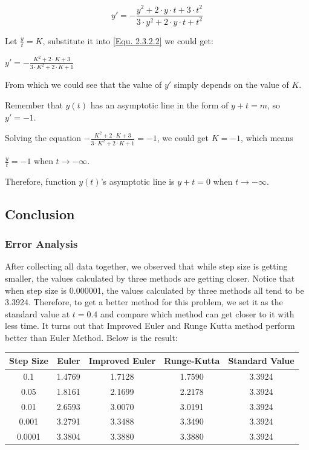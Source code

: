 \documentclass[11pt,a4paper]{article}
\begin{document}
	\begin{equation}
		y' = -\frac{y^2+2\cdot y \cdot t + 3\cdot t^2}{3\cdot y^2+2\cdot y \cdot t + t^2} \tag{Equ 2.3.2.2} \label{Equ. 2.3.2.2}
	\end{equation}

	Let $\frac{y}{t}=K$, substitute it into \ref{Equ. 2.3.2.2} we could get:
	
	\begin{center}
		$y' = -\frac{K^2+2\cdot K+3}{3\cdot K^2+ 2\cdot K +1}$
	\end{center}
	
	From which we could see that the value of $y'$ simply depends on the value of $K$.
	
	Remember that $y(t)$ has an asymptotic line in the form of $y+t=m$, so $y'=-1$.
	
	Solving the equation $-\frac{K^2+2\cdot K+3}{3\cdot K^2+ 2\cdot K +1}=-1$, we could get $K=-1$, which means 
	
	\begin{center}
		$\frac{y}{t}=-1$ when $t\rightarrow -\infty$.
	\end{center}

	Therefore, function $y(t)$'s asymptotic line is $y+t=0$ when $t \rightarrow -\infty$.
	



\subsection{Conclusion}

\subsubsection{Error Analysis}

After collecting all data together, we observed that while step size is getting smaller, the values calculated by three methods are getting closer. Notice that when step size is 0.000001, the values calculated by three methods all tend to be 3.3924. Therefore, to get a better method for this problem, we set it as the standard value at $t = 0.4$ and compare which method can get closer to it with less time. It turns out that Improved Euler and Runge Kutta method perform better than Euler Method. Below is the result:

\begin{table}[H]
	\centering
	\begin{tabular}{c|c|c|c|c}
		Step Size & Euler  & Improved Euler & Runge-Kutta & Standard Value \\ \hline
		0.1       & 1.4769 & 1.7128         & 1.7590      & 3.3924         \\ \hline
		0.05      & 1.8161 & 2.1699         & 2.2178      & 3.3924         \\ \hline
		0.01      & 2.6593 & 3.0070         & 3.0191      & 3.3924         \\ \hline
		0.001     & 3.2791 & 3.3488         & 3.3490      & 3.3924         \\ \hline
		0.0001    & 3.3804 & 3.3880         & 3.3880      & 3.3924        
	\end{tabular}
\end{table}
\end{document}
